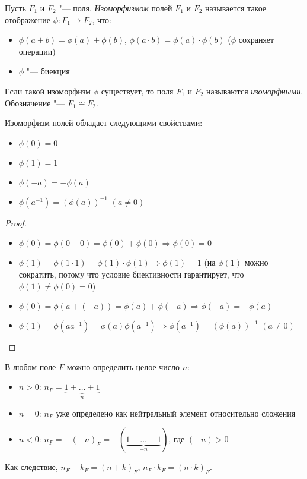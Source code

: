 \begin{definition}
	Пусть $F_1$ и $F_2$ "--- поля. \textit{Изоморфизмом} полей $F_1$ и $F_2$ называется такое отображение $\phi : F_1 \rightarrow F_2$, что:
	\begin{itemize}
		\item $\phi(a + b) = \phi(a) + \phi(b)$, $\phi(a \cdot b) = \phi(a) \cdot \phi(b)$ ($\phi$ сохраняет операции)
		\item $\phi$ "--- биекция
	\end{itemize}
	
	Если такой изоморфизм $\phi$ существует, то поля $F_1$ и $F_2$ называются \textit{изоморфными}. Обозначение "--- $F_1 \cong F_2$.
\end{definition}

\begin{proposition}
	Изоморфизм полей обладает следующими свойствами:
	\begin{itemize}
		\item $\phi(0) = 0$
		\item $\phi(1) = 1$
		\item $\phi(-a) = -\phi(a)$
		\item $\phi(a^{-1}) = (\phi(a))^{-1}$ $(a \ne 0)$
	\end{itemize}
\end{proposition}

\begin{proof}~
	\begin{itemize}
		\item $\phi(0) = \phi(0 + 0) = \phi(0) + \phi(0) \Rightarrow \phi(0) = 0$
		\item $\phi(1) = \phi(1\cdot1) = \phi(1)\cdot\phi(1) \Rightarrow \phi(1) = 1$ (на $\phi(1)$ можно сократить, потому что условие биективности гарантирует, что $\phi(1) \ne \phi(0) = 0$)
		\item $\phi(0) = \phi(a + (-a)) = \phi(a) + \phi(-a) \Rightarrow \phi(-a) = -\phi(a)$
		\item $\phi(1) = \phi(aa^{-1}) = \phi(a)\phi(a^{-1}) \Rightarrow \phi(a^{-1}) = (\phi(a))^{-1}$ $(a \ne 0)$
	\end{itemize}
\end{proof}

\begin{note}
	В любом поле $F$ можно определить целое число $n$:
	\begin{itemize}
		\item $n > 0$: $n_F = \underbrace{1 + \dots + 1}_{n}$
		\item $n = 0$: $n_F$ уже определено как нейтральный элемент относительно сложения
		\item $n < 0$: $n_F = -(-n)_F = -(\underbrace{1 + \dots + 1}_{-n})$, где $(-n) > 0$
	\end{itemize}

	Как следствие, $n_F + k_F = (n + k)_F$, $n_F\cdot k_F = (n\cdot k)_F$.
\end{note}

